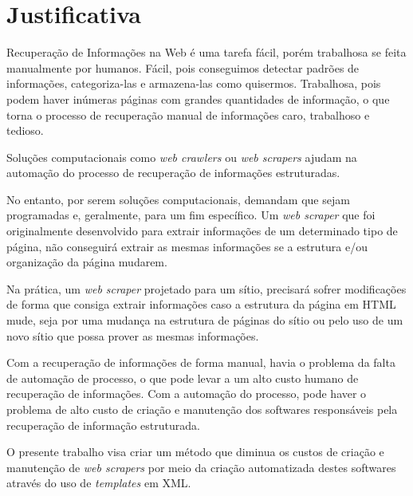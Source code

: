 \chapter{Justificativa}

Recuperação de Informações na Web é uma tarefa fácil, porém trabalhosa se feita manualmente por humanos. Fácil, pois conseguimos detectar padrões de informações, categoriza-las e armazena-las como quisermos. Trabalhosa, pois podem haver inúmeras páginas com grandes quantidades de informação, o que torna o processo de recuperação manual de informações caro, trabalhoso e tedioso.

Soluções computacionais como \emph{web crawlers} ou \emph{web scrapers} ajudam na automação do processo de recuperação de informações estruturadas. 

No entanto, por serem soluções computacionais, demandam que sejam programadas e, geralmente, para um fim específico. Um \emph{web scraper} que foi originalmente desenvolvido para extrair informações de um determinado tipo de página, não conseguirá extrair as mesmas informações se a estrutura e/ou organização da página mudarem.

Na prática, um \emph{web scraper} projetado para um sítio, precisará sofrer modificações de forma que consiga extrair informações caso a estrutura da página em HTML mude, seja por uma mudança na estrutura de páginas do sítio ou pelo uso de um novo sítio que possa prover as mesmas informações.

Com a recuperação de informações de forma manual, havia o problema da falta de automação de processo, o que pode levar a um alto custo humano de recuperação de informações. Com a automação do processo, pode haver o problema de alto custo de criação e manutenção dos softwares responsáveis pela recuperação de informação estruturada.

O presente trabalho visa criar um método que diminua os custos de criação e manutenção de \emph{web scrapers} por meio da criação automatizada destes softwares através do uso de \emph{templates} em XML.